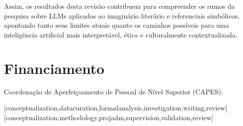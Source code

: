 \documentclass[portuguese]{textolivre}
\begin{document}
Assim, os resultados desta revisão contribuem para compreender os rumos da pesquisa sobre LLMs aplicados ao imaginário literário e referenciais simbólicos, apontando tanto seus limites atuais quanto os caminhos possíveis para uma inteligência artificial mais interpretável, ética e culturalmente contextualizada.

\section*{Financiamento}
Coordenação de Aperfeiçoamento de Pessoal de Nível Superior (CAPES).



\printbibliography\label{sec-bib}


\begin{contributors}
[conceptualization,datacuration,formalanalysis,investigation,writing,review]
[conceptualization,methodology,projadm,supervision,validation,review]
\end{contributors}

\begin{dataavailability}
\end{dataavailability}
\end{document}
